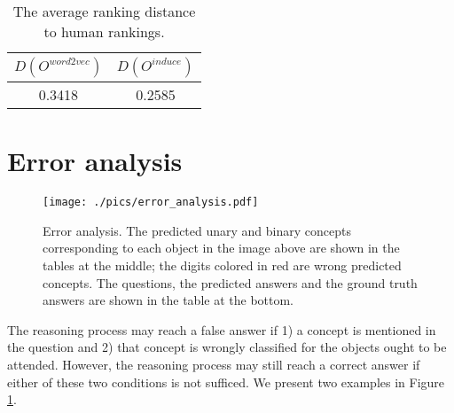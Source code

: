 \documentclass[10pt,twocolumn,letterpaper]{article}
\begin{document}
\begin{table}[t!]
\small
    \centering
    \caption{The average ranking distance to human rankings. }
    \begin{tabular}{cc}
        \toprule
         $D(O^{word2vec})$ & $D(O^{induce})$\\
         \midrule
         0.3418 & 0.2585 \\
         \bottomrule
    \end{tabular}
    \label{gqa_human_study_distance}
    \vspace{-3mm}
\end{table} 
\section{Error analysis}
\begin{figure}
\centering
\texttt{[image: ./pics/error\_analysis.pdf]}
\caption{Error analysis. The predicted unary and binary concepts corresponding to each object in the image above are shown in the tables at the middle; the digits colored in red are wrong predicted concepts. The questions, the predicted answers and the ground truth answers are shown in the table at the bottom.}
\label{error_analysis}
\end{figure}

The reasoning process may reach a false answer if 1) a concept is mentioned in the question and 2) that concept is wrongly classified for the objects ought to be attended. However, the reasoning process may still reach a correct answer if either of these two conditions is not sufficed. We present two examples in Figure \ref{error_analysis}.
\end{document}
